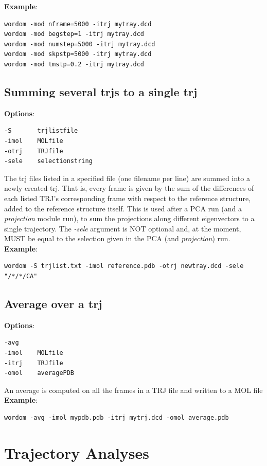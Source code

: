 \documentclass[11pt,twoside,onecolumn,a4paper,openright,notitlepage]{book}[2001/04/21]
\begin{document}
\textbf{\large Example}:
\begin{verbatim}
wordom -mod nframe=5000 -itrj mytray.dcd
wordom -mod begstep=1 -itrj mytray.dcd
wordom -mod numstep=5000 -itrj mytray.dcd
wordom -mod skpstp=5000 -itrj mytray.dcd
wordom -mod tmstp=0.2 -itrj mytray.dcd
\end{verbatim}
%
\section{Summing several trjs to a single trj}
\textbf{\large Options}:
\begin{verbatim}
-S       trjlistfile
-imol    MOLfile
-otrj    TRJfile     
-sele    selectionstring
\end{verbatim}
The trj files listed in a specified file (one filename per line) are summed into a newly created trj. That is, every frame is given by the sum of the differences of each listed TRJ's corresponding frame with respect to the reference structure, added to the reference structure itself. This is used after a PCA run (and a \emph{projection} module run), to sum the projections along different eigenvectors to a single trajectory. The \emph{-sele} argument is NOT optional and, at the moment, MUST be equal to the selection given in the PCA (and \emph{projection}) run.\\

\textbf{\large Example}:
\begin{verbatim}
wordom -S trjlist.txt -imol reference.pdb -otrj newtray.dcd -sele "/*/*/CA"
\end{verbatim}
%
\section{Average over a trj}
\textbf{\large Options}:
\begin{verbatim}
-avg
-imol    MOLfile
-itrj    TRJfile     
-omol    averagePDB
\end{verbatim}
An average is computed on all the frames in a TRJ file and written to a MOL file\\

\textbf{\large Example}:
\begin{verbatim}
wordom -avg -imol mypdb.pdb -itrj mytrj.dcd -omol average.pdb
\end{verbatim}
%


\chapter{Trajectory Analyses}
\end{document}
